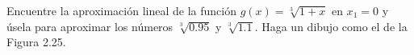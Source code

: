 \item Encuentre la aproximación lineal de la función $g(x) = \sqrt[3]{1 + x}$ en $x_1 = 0$ y úsela para aproximar los números $\sqrt[3]{0.95}$ y $\sqrt[3]{1.1}$. Haga un dibujo como el de la Figura 2.25.
